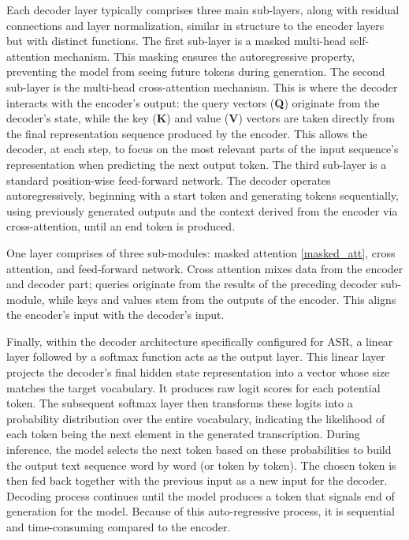 Each decoder layer typically comprises three main sub-layers, along with residual connections and layer normalization, similar in structure to the encoder layers but with distinct functions. The first sub-layer is a masked multi-head self-attention mechanism. This masking ensures the autoregressive property, preventing the model from seeing future tokens during generation. The second sub-layer is the multi-head cross-attention mechanism. This is where the decoder interacts with the encoder's output: the query vectors (\textbf{Q}) originate from the decoder's state, while the key (\textbf{K}) and value (\textbf{V}) vectors are taken directly from the final representation sequence produced by the encoder. This allows the decoder, at each step, to focus on the most relevant parts of the input sequence's representation when predicting the next output token. The third sub-layer is a standard position-wise feed-forward network. The decoder operates autoregressively, beginning with a start token and generating tokens sequentially, using previously generated outputs and the context derived from the encoder via cross-attention, until an end token is produced.

One layer comprises of three sub-modules: masked attention \ref{masked_att}, cross attention, and feed-forward network. Cross attention mixes data from the encoder and decoder part; queries originate from the results of the preceding decoder sub-module, while keys and values stem from the outputs of the encoder. This aligns the encoder's input with the decoder's input. 

Finally, within the decoder architecture specifically configured for ASR, a linear layer followed by a softmax function acts as the output layer. This linear layer projects the decoder's final hidden state representation into a vector whose size matches the target vocabulary. It produces raw logit scores for each potential token. The subsequent softmax layer then transforms these logits into a probability distribution over the entire vocabulary, indicating the likelihood of each token being the next element in the generated transcription. During inference, the model selects the next token based on these probabilities to build the output text sequence word by word (or token by token).
The chosen token is then fed back together with the previous input as a new input for the decoder. Decoding process continues until the model produces a token that signals end of generation for the model. Because of this auto-regressive process, it is sequential and time-consuming compared to the encoder.
\newline


